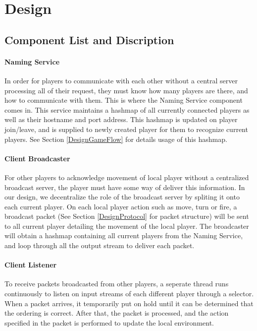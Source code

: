 \section{Design}\label{Design}

\subsection{Component List and Discription}\label{DesignComponent}

\paragraph*{Naming Service}

In order for players to communicate with each other without a central server processing all of their request, they must know how many players are there, and how to communicate with them. This is where the Naming Service component comes in. This service maintains a hashmap of all currently connected players as well as their hostname and port address. This hashmap is updated on player join/leave, and is supplied to newly created player for them to recognize current players. See Section \ref{DesignGameFlow} for details usage of this hashmap.

\paragraph*{Client Broadcaster}

For other players to acknowledge movement of local player without a centralized broadcast server, the player must have some way of deliver this information. In our design, we decentralize the role of the broadcast server by spliting it onto each current player. On each local player action such as move, turn or fire, a broadcast packet (See Section \ref{DesignProtocol} for packet structure) will be sent to all current player detailing the movement of the local player. The broadcaster will obtain a hashmap containing all current players from the Naming Service, and loop through all the output stream to deliver each packet.

\paragraph*{Client Listener}

To receive packets broadcasted from other players, a seperate thread runs continuously to listen on input streams of each different player through a selector. When a packet arrives, it temporarily put on hold until it can be determined that the ordering is correct. After that, the packet is processed, and the action specified in the packet is performed to update the local environment.

